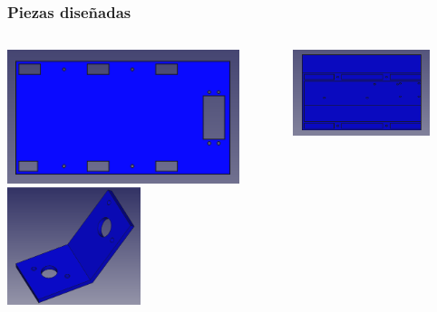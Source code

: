 \documentclass{beamer}
\begin{document}
\begin{frame}
	\frametitle{Piezas diseñadas}
	\begin{columns}
		\begin{column}{0.5\textwidth}
			\centering
			\includegraphics[width=0.87\textwidth]{figs/basevistasuperiorsin.png} \\[20pt]
			\includegraphics[width=0.5\textwidth]{figs/camera3sin.png}\\[10pt]
		\end{column}
		\begin{column}{0.5\textwidth}
			\centering
			\includegraphics[width=0.8\textwidth]{figs/superior2.png} \\[20pt]

\end{column}
\end{columns}
\end{frame}
\end{document}
